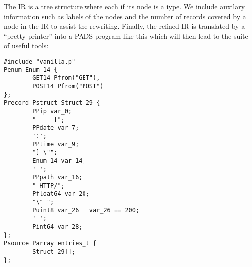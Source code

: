 \documentclass{article}
\begin{document}
The IR is a tree structure where each if its node is a type.
We include auxilary information such as labels of the nodes
and the number of records covered by a node in the IR to assist
the rewriting. Finally, the refined IR is translated
by a ``pretty printer'' into a PADS program like this which will
then lead to the suite of useful tools:

{\small
\begin{verbatim}
#include "vanilla.p"
Penum Enum_14 {
        GET14 Pfrom("GET"),
        POST14 Pfrom("POST")
};
Precord Pstruct Struct_29 {
        PPip var_0;
        " - - [";
        PPdate var_7;
        ':';
        PPtime var_9;
        "] \"";
        Enum_14 var_14;
        ' ';
        PPpath var_16;
        " HTTP/";
        Pfloat64 var_20;
        "\" ";
        Puint8 var_26 : var_26 == 200;
        ' ';
        Pint64 var_28;
};
Psource Parray entries_t {
        Struct_29[];
};
\end{verbatim}
}



\end{document}
